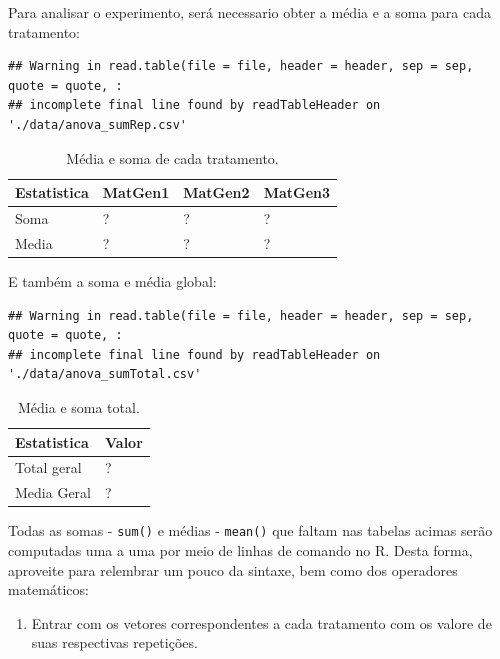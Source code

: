 \documentclass[
]{article}
\providecommand{\tightlist}{%
  \setlength{\itemsep}{0pt}\setlength{\parskip}{0pt}}
\begin{document}
Para analisar o experimento, será necessario obter a média e a soma para cada tratamento:

\begin{verbatim}
## Warning in read.table(file = file, header = header, sep = sep, quote = quote, :
## incomplete final line found by readTableHeader on './data/anova_sumRep.csv'
\end{verbatim}

\begin{table}

\caption{\label{tab:unnamed-chunk-2}Média e soma de cada tratamento.}
\centering
\begin{tabular}[t]{l|l|l|l}
\hline
Estatistica & MatGen1 & MatGen2 & MatGen3\\
\hline
Soma & ? & ? & ?\\
\hline
Media & ? & ? & ?\\
\hline
\end{tabular}
\end{table}

E também a soma e média global:

\begin{verbatim}
## Warning in read.table(file = file, header = header, sep = sep, quote = quote, :
## incomplete final line found by readTableHeader on './data/anova_sumTotal.csv'
\end{verbatim}

\begin{table}

\caption{\label{tab:unnamed-chunk-3}Média e soma total.}
\centering
\begin{tabular}[t]{l|l}
\hline
Estatistica & Valor\\
\hline
Total geral & ?\\
\hline
Media Geral & ?\\
\hline
\end{tabular}
\end{table}

Todas as somas - \texttt{sum()} e médias - \texttt{mean()} que faltam nas tabelas acimas serão computadas uma a uma por meio de linhas de comando no R. Desta forma, aproveite para relembrar um pouco da sintaxe, bem como dos operadores matemáticos:

\begin{enumerate}
\def\labelenumi{\arabic{enumi}.}
\tightlist
\item
  Entrar com os vetores correspondentes a cada tratamento com os valore de suas respectivas repetições.
\end{enumerate}
\end{document}
